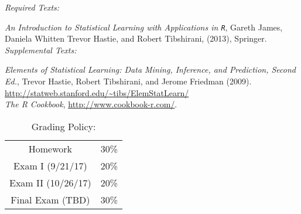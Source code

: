 \documentclass[11pt]{article}
\begin{document}
\emph{Required Texts:} 

\emph{An Introduction to Statistical Learning with Applications in \texttt{R}}, Gareth James, Daniela Whitten Trevor Hastie, and Robert Tibshirani, (2013), Springer.\\

\emph{Supplemental Texts:} 


\emph{Elements of Statistical Learning: Data Mining, Inference, and Prediction, Second Ed.}, Trevor Hastie, Robert Tibshirani, and Jerome Friedman (2009). \url{http://statweb.stanford.edu/~tibs/ElemStatLearn/}\\

\emph{The R Cookbook}, \url{http://www.cookbook-r.com/}.






\begin{table}[ht]
\caption{Grading Policy:}
\begin{center}
\begin{tabular}{cc}
Homework &30\%\\
Exam I (9/21/17) &20\%\\
Exam  II (10/26/17) & 20\%\\
Final Exam  (TBD) & 30\%\\
\end{tabular}
\end{center}
\label{default}
\end{table}%
\end{document}
